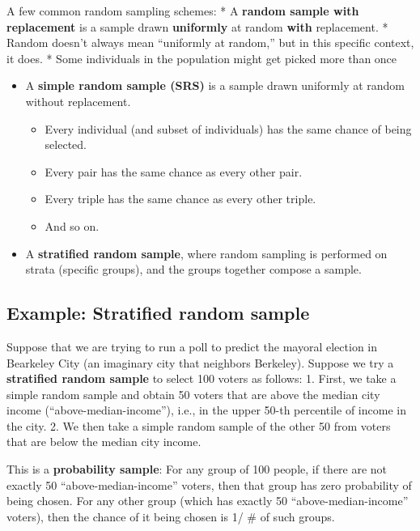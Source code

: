 \documentclass[
  letterpaper,
  DIV=11,
  numbers=noendperiod]{scrreprt}
\providecommand{\tightlist}{%
  \setlength{\itemsep}{0pt}\setlength{\parskip}{0pt}}\usepackage{longtable,booktabs,array}
\begin{document}
A few common random sampling schemes: * A \textbf{random sample with
replacement} is a sample drawn \textbf{uniformly} at random
\textbf{with} replacement. * Random doesn't always mean ``uniformly at
random,'' but in this specific context, it does. * Some individuals in
the population might get picked more than once

\begin{itemize}
\tightlist
\item
  A \textbf{simple random sample (SRS)} is a sample drawn uniformly at
  random without replacement.

  \begin{itemize}
  \tightlist
  \item
    Every individual (and subset of individuals) has the same chance of
    being selected.
  \item
    Every pair has the same chance as every other pair.
  \item
    Every triple has the same chance as every other triple.
  \item
    And so on.
  \end{itemize}
\item
  A \textbf{stratified random sample}, where random sampling is
  performed on strata (specific groups), and the groups together compose
  a sample.
\end{itemize}

\hypertarget{example-stratified-random-sample}{%
\subsection{Example: Stratified random
sample}\label{example-stratified-random-sample}}

Suppose that we are trying to run a poll to predict the mayoral election
in Bearkeley City (an imaginary city that neighbors Berkeley). Suppose
we try a \textbf{stratified random sample} to select 100 voters as
follows: 1. First, we take a simple random sample and obtain 50 voters
that are above the median city income (``above-median-income''), i.e.,
in the upper 50-th percentile of income in the city. 2. We then take a
simple random sample of the other 50 from voters that are below the
median city income.

This is a \textbf{probability sample}: For any group of 100 people, if
there are not exactly 50 ``above-median-income'' voters, then that group
has zero probability of being chosen. For any other group (which has
exactly 50 ``above-median-income'' voters), then the chance of it being
chosen is 1/ \# of such groups.
\end{document}
